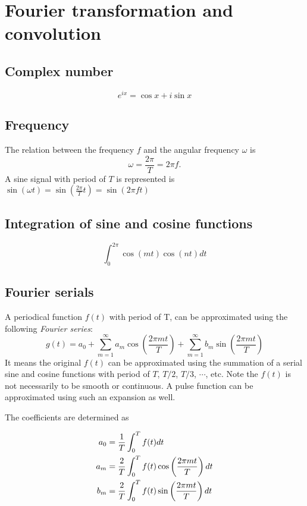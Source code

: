 \documentclass[11pt]{amsart}
\begin{document}
\section{Fourier transformation and convolution}

\subsection{Complex number}
\begin{equation}
e^{ix} = \cos x + i \sin x
\end{equation}

\subsection{Frequency}
The relation between the frequency $f$ and the angular frequency  $\omega$ is
\begin{equation}
\omega=\frac{2 \pi}{T}=2 \pi f.
\end{equation}
A sine signal with period of $T$  is represented is $\sin(\omega t) = \sin(\frac{2\pi}{T}t) = \sin(2\pi f t) $


\subsection{Integration of sine and cosine functions}

\begin{equation}
\int_0^{2\pi}\cos (mt) \cos (nt)  dt 
\end{equation}

\subsection{Fourier serials}
A periodical function $f(t)$ with period of T, can be approximated using the following \emph{Fourier series}:
\begin{equation}
g(t) = a_0 + \sum_{m=1}^{\infty} a_m\cos \left(\frac{2\pi m t}{T}\right )  + \sum_{m=1}^{\infty} b_m\sin \left(\frac{2\pi m t}{T}\right )
\end{equation}
It means the original $f(t)$ can be approximated using the summation of a serial sine and cosine functions with period of $T$, $T/2$, $T/3$, $\cdots$, etc. 
Note the $f(t)$ is not necessarily to be smooth or continuous. A pulse function can be approximated using such an expansion as well.


The coefficients are determined as

\begin{align}
\begin{split}
a_0 & = {1\over T}\int_0^T f(t)dt \\
a_m &= {2\over T}\int_0^T f(t) \cos \left(\frac{2\pi m t}{T}\right )  dt  \\
b_m &= {2\over T}\int_0^T f(t) \sin \left(\frac{2\pi m t}{T}\right )  dt 
\end{split}
\end{align}
\end{document}

